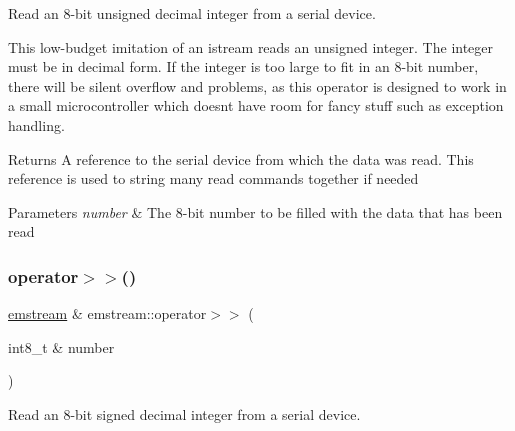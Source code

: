Read an 8-\/bit unsigned decimal integer from a serial device. 

This low-\/budget imitation of an {\ttfamily istream} reads an unsigned integer. The integer must be in decimal form. If the integer is too large to fit in an 8-\/bit number, there will be silent overflow and problems, as this operator is designed to work in a small microcontroller which doesn\textquotesingle{}t have room for fancy stuff such as exception handling. \begin{DoxyReturn}{Returns}
A reference to the serial device from which the data was read. This reference is used to string many read commands together if needed 
\end{DoxyReturn}

\begin{DoxyParams}{Parameters}
{\em number} & The 8-\/bit number to be filled with the data that has been read \\
\hline
\end{DoxyParams}
\mbox{\label{classemstream_a8dfe916d7db9331beaf5dc98b6c5b9ea}} 
\subsubsection{\texorpdfstring{operator$>$$>$()}{operator>>()}\hspace{0.1cm}{\footnotesize\ttfamily [3/8]}}
{\footnotesize\ttfamily \mbox{\hyperlink{classemstream}{emstream}} \& emstream\+::operator$>$$>$ (\begin{DoxyParamCaption}\item[{int8\+\_\+t \&}]{number }\end{DoxyParamCaption})}



Read an 8-\/bit signed decimal integer from a serial device. 

